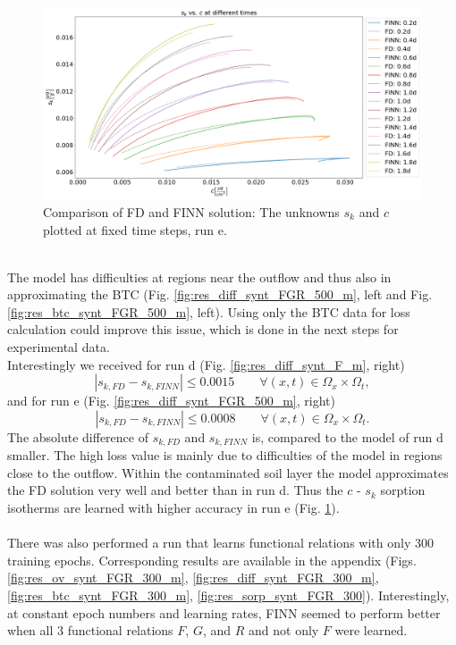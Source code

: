 \begin{figure}[h]
	\centering
	\includegraphics[width=\textwidth]{images/res_sorp_synt_FGR_500.png}
\caption[Comparison of FD and FINN sorption behavior, run e]{Comparison of FD and FINN solution: The unknowns $s_k$ and $c$ plotted at fixed time steps, run e.}
\label{fig:res_sorp_synt_FGR_500}
\end{figure}\\
The model has difficulties at regions near the outflow and thus also in approximating the BTC (Fig. \ref{fig:res_diff_synt_FGR_500_m}, left and Fig. \ref{fig:res_btc_synt_FGR_500_m}, left). Using only the BTC data for loss calculation could improve this issue, which is done in the next steps for experimental data.\\
Interestingly we received for run d (Fig. \ref{fig:res_diff_synt_F_m}, right)
\begin{equation}
    |s_{k,FD} - s_{k, FINN}| \leq 0.0015 \qquad \forall (x, t) \in \Omega_x \times \Omega_t,
\end{equation}
and for run e (Fig. \ref{fig:res_diff_synt_FGR_500_m}, right)
\begin{equation}
    |s_{k,FD} - s_{k, FINN}| \leq 0.0008 \qquad \forall (x, t) \in \Omega_x \times \Omega_t.
\end{equation}
The absolute difference of $s_{k,FD}$ and $s_{k, FINN}$ is, compared to the model of run d smaller. The high loss value is mainly due to difficulties of the model in regions close to the outflow. Within the contaminated soil layer the model approximates the FD solution very well and better than in run d. Thus the $c$ - $s_k$ sorption isotherms are learned with higher accuracy in run e (Fig. \ref{fig:res_sorp_synt_FGR_500}).\\
\\
There was also performed a run that learns functional relations with only 300 training epochs. Corresponding results are available in the appendix (Figs. \ref{fig:res_ov_synt_FGR_300_m}, \ref{fig:res_diff_synt_FGR_300_m}, \ref{fig:res_btc_synt_FGR_300_m}, \ref{fig:res_sorp_synt_FGR_300}). Interestingly, at constant epoch numbers and learning rates, FINN seemed to perform better when all 3 functional relations $F$, $G$, and $R$ and not only $F$ were learned.
\FloatBarrier
